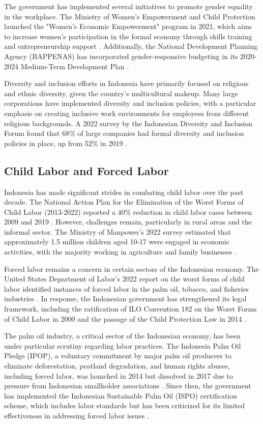 The government has implemented several initiatives to promote gender equality in the workplace. The Ministry of Women's Empowerment and Child Protection launched the "Women's Economic Empowerment" program in 2021, which aims to increase women's participation in the formal economy through skills training and entrepreneurship support \cite{ref12}. Additionally, the National Development Planning Agency (BAPPENAS) has incorporated gender-responsive budgeting in its 2020-2024 Medium-Term Development Plan \cite{ref13}.

Diversity and inclusion efforts in Indonesia have primarily focused on religious and ethnic diversity, given the country's multicultural makeup. Many large corporations have implemented diversity and inclusion policies, with a particular emphasis on creating inclusive work environments for employees from different religious backgrounds. A 2022 survey by the Indonesian Diversity and Inclusion Forum found that 68\% of large companies had formal diversity and inclusion policies in place, up from 52\% in 2019 \cite{ref14}.

\subsection{Child Labor and Forced Labor}

Indonesia has made significant strides in combating child labor over the past decade. The National Action Plan for the Elimination of the Worst Forms of Child Labor (2013-2022) reported a 40\% reduction in child labor cases between 2009 and 2019 \cite{ref15}. However, challenges remain, particularly in rural areas and the informal sector. The Ministry of Manpower's 2022 survey estimated that approximately 1.5 million children aged 10-17 were engaged in economic activities, with the majority working in agriculture and family businesses \cite{ref16}.

Forced labor remains a concern in certain sectors of the Indonesian economy. The United States Department of Labor's 2022 report on the worst forms of child labor identified instances of forced labor in the palm oil, tobacco, and fisheries industries \cite{ref17}. In response, the Indonesian government has strengthened its legal framework, including the ratification of ILO Convention 182 on the Worst Forms of Child Labor in 2000 and the passage of the Child Protection Law in 2014 \cite{ref18}.

The palm oil industry, a critical sector of the Indonesian economy, has been under particular scrutiny regarding labor practices. The Indonesia Palm Oil Pledge (IPOP), a voluntary commitment by major palm oil producers to eliminate deforestation, peatland degradation, and human rights abuses, including forced labor, was launched in 2014 but dissolved in 2017 due to pressure from Indonesian smallholder associations \cite{ref19}. Since then, the government has implemented the Indonesian Sustainable Palm Oil (ISPO) certification scheme, which includes labor standards but has been criticized for its limited effectiveness in addressing forced labor issues \cite{ref20}.

